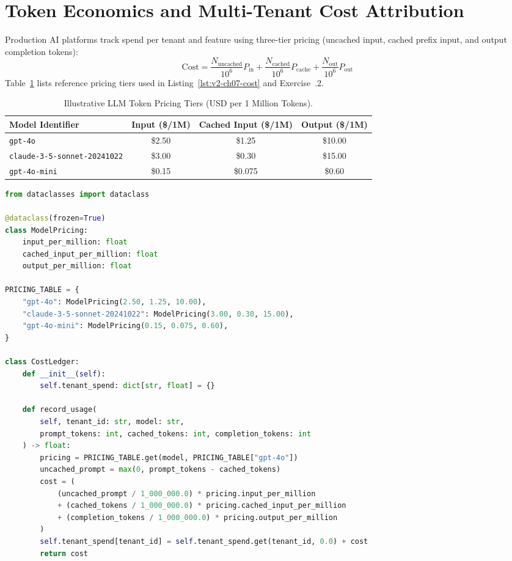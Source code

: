 \section{Token Economics and Multi-Tenant Cost Attribution}

Production AI platforms track spend per tenant and feature using three-tier pricing (uncached input, cached prefix input, and output completion tokens):
\begin{equation}
\text{Cost} = \frac{N_{\text{uncached}}}{10^6} P_{\text{in}} + \frac{N_{\text{cached}}}{10^6} P_{\text{cache}} + \frac{N_{\text{out}}}{10^6} P_{\text{out}}
\end{equation}
Table~\ref{tab:model_pricing} lists reference pricing tiers used in Listing~\ref{lst:v2-ch07-cost} and Exercise~\thechapter.2.

\begin{table}[htbp]
\centering
\small
\begin{tabular}{lccc}
\toprule
\textbf{Model Identifier} & \textbf{Input (\$/1M)} & \textbf{Cached Input (\$/1M)} & \textbf{Output (\$/1M)} \\
\midrule
\texttt{gpt-4o} & \$2.50 & \$1.25 & \$10.00 \\
\texttt{claude-3-5-sonnet-20241022} & \$3.00 & \$0.30 & \$15.00 \\
\texttt{gpt-4o-mini} & \$0.15 & \$0.075 & \$0.60 \\
\bottomrule
\end{tabular}
\caption{Illustrative LLM Token Pricing Tiers (USD per 1 Million Tokens).}
\label{tab:model_pricing}
\end{table}

\begin{lstlisting}[language=Python, label={lst:v2-ch07-cost}, caption={Multi-Tenant Token Cost Ledger}]
from dataclasses import dataclass

@dataclass(frozen=True)
class ModelPricing:
    input_per_million: float
    cached_input_per_million: float
    output_per_million: float

PRICING_TABLE = {
    "gpt-4o": ModelPricing(2.50, 1.25, 10.00),
    "claude-3-5-sonnet-20241022": ModelPricing(3.00, 0.30, 15.00),
    "gpt-4o-mini": ModelPricing(0.15, 0.075, 0.60),
}

class CostLedger:
    def __init__(self):
        self.tenant_spend: dict[str, float] = {}

    def record_usage(
        self, tenant_id: str, model: str,
        prompt_tokens: int, cached_tokens: int, completion_tokens: int
    ) -> float:
        pricing = PRICING_TABLE.get(model, PRICING_TABLE["gpt-4o"])
        uncached_prompt = max(0, prompt_tokens - cached_tokens)
        cost = (
            (uncached_prompt / 1_000_000.0) * pricing.input_per_million
            + (cached_tokens / 1_000_000.0) * pricing.cached_input_per_million
            + (completion_tokens / 1_000_000.0) * pricing.output_per_million
        )
        self.tenant_spend[tenant_id] = self.tenant_spend.get(tenant_id, 0.0) + cost
        return cost
\end{lstlisting}

